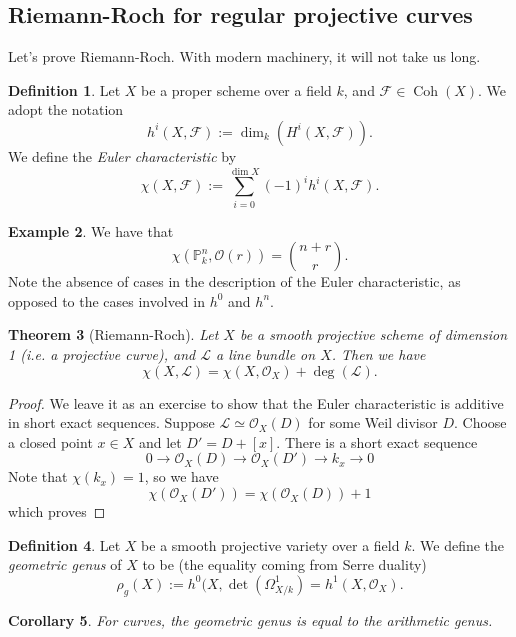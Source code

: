 \documentclass[10pt]{article}
\newtheorem{thm}{Theorem}[section]
\newtheorem{cor}[thm]{Corollary}
\theoremstyle{definition}
\newtheorem{exmp}[thm]{Example}
\newtheorem{defn}[thm]{Definition}
\DeclareMathOperator{\Coh}{Coh}
\newcommand{\PP}{\mathbb{P}}
\newcommand{\OO}{\mathcal{O}}
\begin{document}
\subsection{Riemann-Roch for regular projective curves}

Let's prove Riemann-Roch.  With modern machinery, it will not take us long.

\begin{defn}
Let $X$ be a proper scheme over a field $k$, and $\mathcal{F} \in \Coh(X)$.  We adopt the notation
$$h^i(X, \mathcal{F}) := \dim_k(H^i(X, \mathcal{F})).$$
We define the \emph{Euler characteristic} by
$$\chi(X, \mathcal{F}) := \sum_{i=0}^{\dim X} (-1)^i h^i(X, \mathcal{F}).$$
\end{defn}

\begin{exmp}
We have that
$$\chi(\PP^n_k, \OO(r)) = \binom{n+r}{r}.$$
Note the absence of cases in the description of the Euler characteristic, as opposed to the cases involved in $h^0$ and $h^n$.
\end{exmp}




\begin{thm}[Riemann-Roch]
Let $X$ be a smooth projective scheme of dimension 1 (i.e. a projective curve), and $\mathcal{L}$ a line bundle on $X$.  Then we have
$$\chi(X, \mathcal{L}) = \chi(X, \OO_X) + \deg(\mathcal{L}).$$
\end{thm}
\begin{proof}
We leave it as an exercise to show that the Euler characteristic is additive in short exact sequences.  Suppose $\mathcal{L} \simeq \OO_X(D)$ for some Weil divisor $D$.  Choose a closed point $x \in X$ and let $D' = D + [x]$.  There is a short exact sequence
$$0 \rightarrow \OO_X(D) \rightarrow \OO_X(D') \rightarrow k_x \rightarrow 0$$
Note that $\chi(k_x) = 1$, so we have
$$\chi(\OO_X(D')) = \chi(\OO_X(D)) + 1$$
which proves 
\end{proof}

\begin{defn}
Let $X$ be a smooth projective variety over a field $k$.  We define the \emph{geometric genus} of $X$ to be (the equality coming from Serre duality)
$$\rho_g(X) := h^0(X, \det(\Omega^1_{X/k}) = h^1(X, \OO_X).$$
\end{defn}

\begin{cor}
For curves, the geometric genus is equal to the arithmetic genus.
\end{cor}
\end{document}
